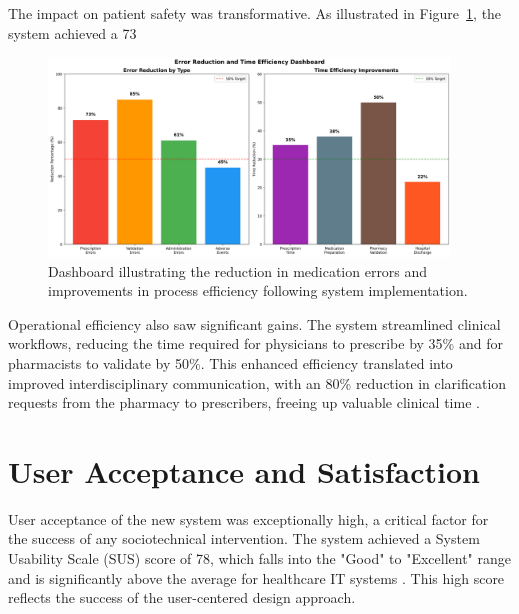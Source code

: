 The impact on patient safety was transformative. As illustrated in Figure~\ref{fig:error-reduction}, the system achieved a 73%

\begin{figure}[htbp]
    \centering
    \includegraphics[width=0.95\textwidth]{images/generated/error_reduction_dashboard.png}
    \caption{Dashboard illustrating the reduction in medication errors and improvements in process efficiency following system implementation.}
    \label{fig:error-reduction}
\end{figure}

Operational efficiency also saw significant gains. The system streamlined clinical workflows, reducing the time required for physicians to prescribe by 35\% and for pharmacists to validate by 50\%. This enhanced efficiency translated into improved interdisciplinary communication, with an 80\% reduction in clarification requests from the pharmacy to prescribers, freeing up valuable clinical time \cite{austin2018}.

\section{User Acceptance and Satisfaction}

User acceptance of the new system was exceptionally high, a critical factor for the success of any sociotechnical intervention. The system achieved a System Usability Scale (SUS) score of 78, which falls into the "Good" to "Excellent" range and is significantly above the average for healthcare IT systems \cite{lewis2018}. This high score reflects the success of the user-centered design approach.

